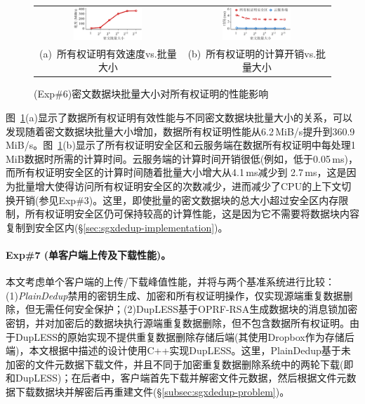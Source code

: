 \begin{figure}[!htb]
    \centering
    \begin{tabular}{@{\ }c@{\ }c}
        \includegraphics[width=0.49\textwidth]{pic/sgxdedup/plot/exp_a4/expa4_powBatchSize_overall.pdf} & 
        \includegraphics[width=0.49\textwidth]{pic/sgxdedup/plot/exp_a4/expa4_powBatchSize_breakdown.pdf}  \\
        \mbox{\small (a) 所有权证明有效速度vs.批量大小}                                                 & 
        \mbox{\small (b) 所有权证明的计算开销vs.批量大小}
    \end{tabular}
    \caption{(Exp\#6)密文数据块批量大小对所有权证明的性能影响}
    \label{fig:sgxdedup-exp-pow-impact}
\end{figure}

图~\ref{fig:sgxdedup-exp-pow-impact}(a)显示了数据所有权证明有效性能与不同密文数据块批量大小的关系，可以发现随着密文数据块批量大小增加，数据所有权证明性能从6.2\,MiB/s提升到360.9\,MiB/s。图~\ref{fig:sgxdedup-exp-pow-impact}(b)显示了所有权证明安全区和云服务端在数据所有权证明中每处理1\,MiB数据时所需的计算时间。云服务端的计算时间开销很低(例如，低于0.05\,ms)，而所有权证明安全区的计算时间随着批量大小增大从4.1\,ms减少到 2.7\,ms，这是因为批量增大使得访问所有权证明安全区的次数减少，进而减少了CPU的上下文切换开销(参见Exp\#3)。这里，即使批量的密文数据块的总大小超过安全区内存限制，所有权证明安全区仍可保持较高的计算性能，这是因为它不需要将数据块内容复制到安全区内(\S\ref{sec:sgxdedup-implementation})。


\paragraph*{Exp\#7 (单客户端上传及下载性能)。}本文考虑单个客户端的上传/下载峰值性能，并将\sysnameS 与两个基准系统进行比较：(1)\textit{PlainDedup}禁用\sysnameS 的密钥生成、加密和所有权证明操作，仅实现源端重复数据删除，但无需任何安全保护；(2)DupLESS基于OPRF-RSA生成数据块的消息锁加密密钥，并对加密后的数据块执行源端重复数据删除，但不包含数据所有权证明。由于DupLESS的原始实现不提供重复数据删除存储后端(其使用Dropbox作为存储后端)，本文根据中描述的设计使用C++实现DupLESS。这里，PlainDedup基于未加密的文件元数据下载文件，并且不同于加密重复数据删除系统中的两轮下载(即\sysnameS 和DupLESS)；在后者中，客户端首先下载并解密文件元数据，然后根据文件元数据下载数据块并解密后再重建文件(\S\ref{subsec:sgxdedup-problem})。

